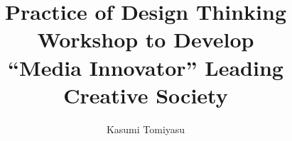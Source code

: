 \documentclass[12pt,a4j]{jreport}	%
\title{Practice of Design Thinking Workshop to Develop\\
  ``Media Innovator'' Leading Creative Society}
\author{Kasumi Tomiyasu}
\begin{document}
\def\chaptermark#1{\markboth{#1}{ }}%
%
%
\titlepage
\comemberspage
\firstabstract
\secondabstract	%
%
%
\toc
\ifPROPOSAL
\else
   \newpage
   \listoffigures
   \listoftables
\fi

\newpage
{}
\def\chaptermark#1{\markboth{\thechapter.\ #1}{ }}%

%
%


%
%
%
%
%
%
%
\def\chaptermark#1{\markboth{#1}{ }}%

%
%
\acknowledgements
\acknowledgementstext

\newpage


%


%
%



%
\ifCHICAGO
   
\else
   
\fi
%
%
%
\appendix
\def\chaptermark#1{\markboth{\thechapter.\ #1}{ }}%
%

%
\end{document}
